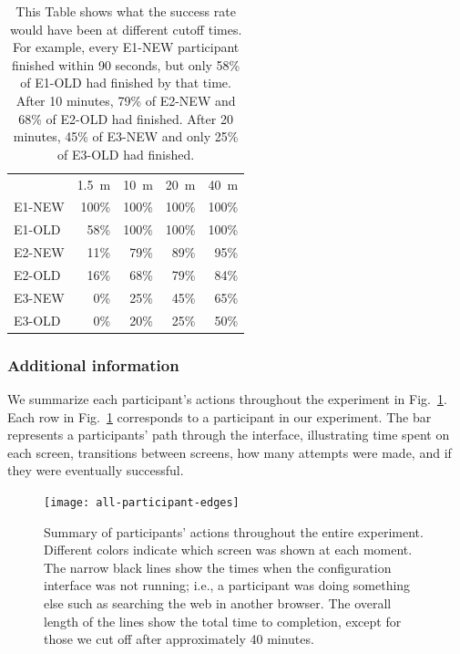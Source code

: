 \documentclass[USenglish,oneside,twocolumn]{article}
\begin{document}
\begin{table}
\centering 
	\begin{tabular}{l r r r r}
	& \multicolumn{1}{c}{1.5~m} & \multicolumn{1}{c}{10~m} & \multicolumn{1}{c}{20~m} & \multicolumn{1}{c}{40~m} \\
	\noalign{\hrule}
	E1-NEW & 100\% & 100\% & 100\% & 100\% \\
	E1-OLD & 58\% & 100\% & 100\% & 100\% \\
	E2-NEW & 11\% & 79\% & 89\% & 95\% \\
	E2-OLD & 16\% & 68\% & 79\% & 84\% \\
	E3-NEW & 0\% & 25\% & 45\% & 65\% \\
	E3-OLD & 0\% & 20\% & 25\% & 50\% \\
	\end{tabular}
\caption{This Table shows what the success rate would have been
at different cutoff times.
For example, every E1-NEW participant finished within 90 seconds,
but only 58\% of E1-OLD had finished by that time.
After 10 minutes, 79\% of E2-NEW and 68\% of E2-OLD had finished.
After 20 minutes, 45\% of E3-NEW and only 25\% of E3-OLD had finished.}
\label{table:less_time}
\end{table}

\subsubsection{Additional information} 
We summarize each participant's actions throughout the experiment in Fig.~\ref{fig:all-participant-edges}. Each row in Fig.~\ref{fig:all-participant-edges} corresponds to a participant in our experiment. The bar represents a participants' path through the interface, illustrating time spent on each screen, transitions between screens, how many attempts were made, and if they were eventually successful. 

\begin{figure}
\centering
\texttt{[image: all-participant-edges]}
\caption{
Summary of participants' actions throughout the entire experiment.
Different colors indicate which screen was shown at each moment.
The narrow black lines show the times when the configuration interface
was not running; i.e., a participant was doing something else
such as searching the web in another browser.
The overall length of the lines show the total time to completion,
except for those we cut off after approximately 40 minutes.
}
\label{fig:all-participant-edges}
\end{figure}
\end{document}
